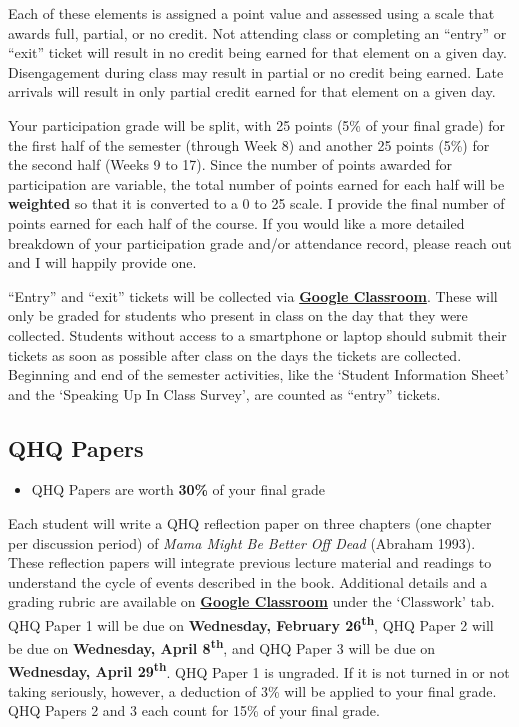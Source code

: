 \documentclass[]{book}
\newenvironment{rmdblock}[1]
  {\begin{shaded*}
  \begin{itemize}
  \renewcommand{\labelitemi}{
    \raisebox{-.7\height}[0pt][0pt]{
      {\setkeys{Gin}{width=3em,keepaspectratio}\texttt{[image: images/\#1]}}
    }
  }
  \item
  }
  {
  \end{itemize}
  \end{shaded*}
  }
\newenvironment{rmdtip}
  {\begin{rmdblock}{tip}}
  {\end{rmdblock}}
\begin{document}
Each of these elements is assigned a point value and assessed using a scale that awards full, partial, or no credit. Not attending class or completing an ``entry'' or ``exit'' ticket will result in no credit being earned for that element on a given day. Disengagement during class may result in partial or no credit being earned. Late arrivals will result in only partial credit earned for that element on a given day.

Your participation grade will be split, with 25 points (5\% of your final grade) for the first half of the semester (through Week 8) and another 25 points (5\%) for the second half (Weeks 9 to 17). Since the number of points awarded for participation are variable, the total number of points earned for each half will be \textbf{weighted} so that it is converted to a 0 to 25 scale. I provide the final number of points earned for each half of the course. If you would like a more detailed breakdown of your participation grade and/or attendance record, please reach out and I will happily provide one.

``Entry'' and ``exit'' tickets will be collected via \textbf{\href{https://classroom.google.com}{Google Classroom}}. These will only be graded for students who present in class on the day that they were collected. Students without access to a smartphone or laptop should submit their tickets as soon as possible after class on the days the tickets are collected. Beginning and end of the semester activities, like the `Student Information Sheet' and the `Speaking Up In Class Survey', are counted as ``entry'' tickets.

\hypertarget{qhq-papers}{%
\subsection{QHQ Papers}\label{qhq-papers}}

\begin{rmdtip}
QHQ Papers are worth \textbf{30\%} of your final grade
\end{rmdtip}

Each student will write a QHQ reflection paper on three chapters (one chapter per discussion period) of \emph{Mama Might Be Better Off Dead} (Abraham 1993). These reflection papers will integrate previous lecture material and readings to understand the cycle of events described in the book. Additional details and a grading rubric are available on \textbf{\href{https://classroom.google.com}{Google Classroom}} under the `Classwork' tab. QHQ Paper 1 will be due on \textbf{Wednesday, February 26\textsuperscript{th}}, QHQ Paper 2 will be due on \textbf{Wednesday, April 8\textsuperscript{th}}, and QHQ Paper 3 will be due on \textbf{Wednesday, April 29\textsuperscript{th}}. QHQ Paper 1 is ungraded. If it is not turned in or not taking seriously, however, a deduction of 3\% will be applied to your final grade. QHQ Papers 2 and 3 each count for 15\% of your final grade.
\end{document}
